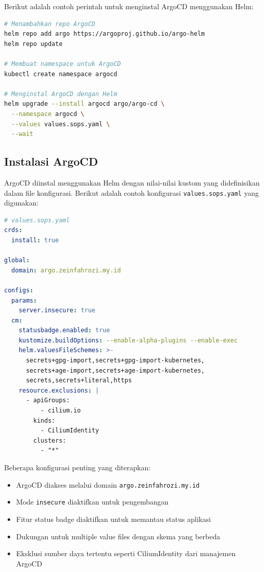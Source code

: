 Berikut adalah contoh perintah untuk menginstal ArgoCD menggunakan Helm:

\begin{lstlisting}[language=bash, basicstyle=\footnotesize\ttfamily]
# Menambahkan repo ArgoCD
helm repo add argo https://argoproj.github.io/argo-helm
helm repo update

# Membuat namespace untuk ArgoCD
kubectl create namespace argocd

# Menginstal ArgoCD dengan Helm
helm upgrade --install argocd argo/argo-cd \
  --namespace argocd \
  --values values.sops.yaml \
  --wait
\end{lstlisting}

\subsection{Instalasi ArgoCD}
ArgoCD diinstal menggunakan Helm dengan nilai-nilai kustom yang didefinisikan dalam file konfigurasi. Berikut adalah contoh konfigurasi \texttt{values.sops.yaml} yang digunakan:

\begin{lstlisting}[language=yaml, basicstyle=\footnotesize\ttfamily]
# values.sops.yaml
crds:
  install: true

global:
  domain: argo.zeinfahrozi.my.id

configs:
  params:
    server.insecure: true
  cm:
    statusbadge.enabled: true
    kustomize.buildOptions: --enable-alpha-plugins --enable-exec
    helm.valuesFileSchemes: >-
      secrets+gpg-import,secrets+gpg-import-kubernetes,
      secrets+age-import,secrets+age-import-kubernetes,
      secrets,secrets+literal,https
    resource.exclusions: |
      - apiGroups:
          - cilium.io
        kinds:
          - CiliumIdentity
        clusters:
          - "*"
\end{lstlisting}

Beberapa konfigurasi penting yang diterapkan:

\begin{itemize}
  \item ArgoCD diakses melalui domain \texttt{argo.zeinfahrozi.my.id}
  \item Mode \texttt{insecure} diaktifkan untuk pengembangan
  \item Fitur status badge diaktifkan untuk memantau status aplikasi
  \item Dukungan untuk multiple value files dengan skema yang berbeda
  \item Eksklusi sumber daya tertentu seperti CiliumIdentity dari manajemen ArgoCD
\end{itemize}

